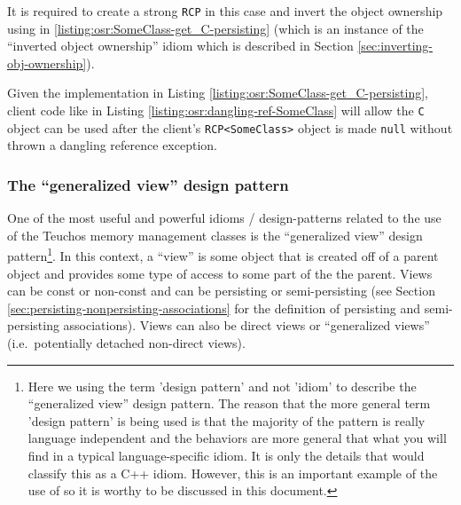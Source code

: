 \documentclass[pdf,ps2pdf,11pt]{SANDreport}
\begin{document}
It is required to create a strong {}\texttt{RCP} in this case and
invert the object ownership using in
{}\ref{listing:osr:SomeClass-get_C-persisting} (which is an instance
of the ``inverted object ownership'' idiom which is described in
Section {}\ref{sec:inverting-obj-ownership}).

Given the implementation in Listing
{}\ref{listing:osr:SomeClass-get_C-persisting}, client code like in
Listing {}\ref{listing:osr:dangling-ref-SomeClass} will allow the
{}\texttt{C} object can be used after the client's
{}\texttt{RCP<SomeClass>} object is made {}\texttt{null} without
thrown a dangling reference exception.


%
{}\subsubsection{The ``generalized view'' design pattern}
\label{sec:generalized-view-design-pattern}
%

One of the most useful and powerful idioms / design-patterns related
to the use of the Teuchos memory management classes is the
``generalized view'' design pattern\footnote{Here we using the term
'design pattern' and not 'idiom' to describe the ``generalized view''
design pattern.  The reason that the more general term 'design
pattern' is being used is that the majority of the pattern is really
language independent and the behaviors are more general that what you
will find in a typical language-specific idiom.  It is only the
{} details that would classify this as a C++ idiom.  However,
this is an important example of the use of {} so it is worthy
to be discussed in this document.}.  In this context, a ``view'' is
some object that is created off of a parent object and provides some
type of access to some part of the the parent.  Views can be const or
non-const and can be persisting or semi-persisting (see Section
{}\ref{sec:persisting-nonpersisting-associations} for the definition
of persisting and semi-persisting associations).  Views can also be
direct views or ``generalized views'' (i.e.\ potentially detached
non-direct views).
\end{document}
